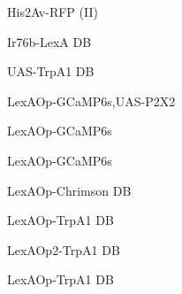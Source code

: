 \documentclass[17pt]{extarticle}
\begin{document}
\footnotesize
\newpage\vspace*{-0.15cm}
\begin{normalsize}
His2Av-RFP (II) \\[0.5em]
\end{normalsize}
\footnotesize
\newpage\vspace*{-0.15cm}
\begin{normalsize}
Ir76b-LexA DB \\[0.5em]
\end{normalsize}
\footnotesize
\newpage\vspace*{-0.15cm}
\begin{normalsize}
UAS-TrpA1 DB \\[0.5em]
\end{normalsize}
\footnotesize
\newpage\vspace*{-0.15cm}
\begin{footnotesize}
LexAOp-GCaMP6s,UAS-P2X2 \\[0.5em]
\end{footnotesize}
\footnotesize
\newpage\vspace*{-0.15cm}
\begin{normalsize}
LexAOp-GCaMP6s \\[0.5em]
\end{normalsize}
\footnotesize
\newpage\vspace*{-0.15cm}
\begin{normalsize}
LexAOp-GCaMP6s \\[0.5em]
\end{normalsize}
\footnotesize
\newpage\vspace*{-0.15cm}
\begin{footnotesize}
LexAOp-Chrimson DB \\[0.5em]
\end{footnotesize}
\footnotesize
\newpage\vspace*{-0.15cm}
\begin{normalsize}
LexAOp-TrpA1 DB \\[0.5em]
\end{normalsize}
\footnotesize
\newpage\vspace*{-0.15cm}
\begin{footnotesize}
LexAOp2-TrpA1 DB \\[0.5em]
\end{footnotesize}
\footnotesize
\newpage\vspace*{-0.15cm}
\begin{normalsize}
LexAOp-TrpA1 DB \\[0.5em]
\end{normalsize}
\end{document}
